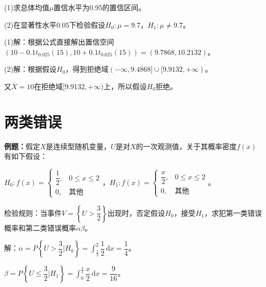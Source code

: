 \documentclass[UTF8, 12pt]{ctexart}
\begin{document}
(1)求总体均值$\mu$置信水平为0.95的置信区间。

(2)在显著性水平$0.05$下检验假设$H_0:\mu=9.7$，$H_1:\mu\neq9.7$。

(1)解：根据公式直接解出置信空间$(10-0.1t_{0.025}(15),10+0.1t_{0.025}(15))=(9.7868,10.2132)$。

(2)解：根据假设$H_0$，得到拒绝域$(-\infty,9.4868]\cup[9.9132,+\infty)$。

又$\overline{X}=10$在拒绝域$[9.9132,+\infty)$上，所以假设$H_0$拒绝。

\section{两类错误}

\textbf{例题：}假定$X$是连续型随机变量，$U$是对$X$的一次观测值，关于其概率密度$f(x)$有如下假设：

$H_0:f(x)=\left\{\begin{array}{ll}
    \dfrac{1}{2}, & 0\leqslant x\leqslant2 \\
    0, & \text{其他}
\end{array}\right.$，$H_1:f(x)=\left\{\begin{array}{ll}
    \dfrac{x}{2}, & 0\leqslant x\leqslant2 \\
    0, & \text{其他}
\end{array}\right.$。

检验规则：当事件$V=\left\{U>\dfrac{3}{2}\right\}$出现时，否定假设$H_0$，接受$H_1$，求犯第一类错误概率和第二类错误概率$\alpha\beta$。

解：$\alpha=P\left\{U>\dfrac{3}{2}\bigg|H_0\right\}=\displaystyle{\int_\frac{3}{2}^2\dfrac{1}{2}\,\textrm{d}x=\dfrac{1}{4}}$。

$\beta=P\left\{U\leqslant\dfrac{3}{2}\bigg|H_1\right\}=\displaystyle{\int_0^{\frac{3}{2}}\dfrac{x}{2}\,\textrm{d}x=\dfrac{9}{16}}$。
\end{document}
